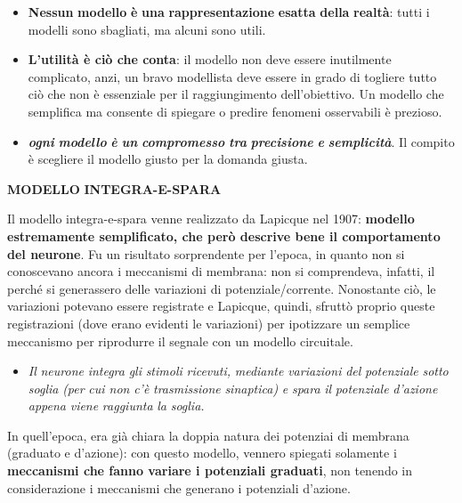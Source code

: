 \documentclass[12pt,a4paper]{book}
\begin{document}
\begin{itemize}
  \item \textbf{Nessun}\textbf{ }\textbf{modello}\textbf{ }\textbf{è}\textbf{ }\textbf{una}\textbf{ }\textbf{rappresentazione}\textbf{ }\textbf{esatta}\textbf{ }\textbf{della}\textbf{ }\textbf{realtà}: tutti i modelli sono sbagliati, ma alcuni sono utili.
  \item \textbf{L'utilità è ciò che conta}: il modello non deve essere inutilmente complicato, anzi, un bravo modellista deve essere in grado di togliere tutto ciò che non è essenziale per il raggiungimento dell'obiettivo. Un modello che sempliﬁca ma consente di spiegare o predire fenomeni osservabili è prezioso.
  \item \textbf{\textit{ogni}}\textbf{\textit{ }}\textbf{\textit{modello}}\textbf{\textit{ }}\textbf{\textit{è}}\textbf{\textit{ }}\textbf{\textit{un}}\textbf{\textit{ }}\textbf{\textit{compromesso}}\textbf{\textit{ }}\textbf{\textit{tra}}\textbf{\textit{ }}\textbf{\textit{precisione}}\textbf{\textit{ }}\textbf{\textit{e}}\textbf{\textit{ }}\textbf{\textit{semplicità}}. Il compito è scegliere il modello giusto per la domanda giusta.
\end{itemize}
\textbf{MODELLO}\textbf{  }\textbf{INTEGRA-E-}\textbf{SPARA}

Il modello integra-e-spara venne realizzato da Lapicque nel 1907: \textbf{modello estremamente sempliﬁcato, che però descrive bene il comportamento del neurone}. Fu un risultato sorprendente per l'epoca, in quanto non si conoscevano ancora i meccanismi di membrana: non si comprendeva, infatti, il perché si generassero delle variazioni di potenziale/corrente. Nonostante ciò, le variazioni potevano essere registrate e Lapicque, quindi, sfruttò proprio queste registrazioni (dove erano evidenti le variazioni) per ipotizzare un semplice meccanismo per riprodurre il segnale con un modello circuitale.

\begin{itemize}
  \item \textit{Il}\textit{ }\textit{neurone}\textit{ }\textit{integra}\textit{ }\textit{gli}\textit{ }\textit{stimoli}\textit{ }\textit{ricevuti,}\textit{ }\textit{mediante}\textit{ }\textit{variazioni}\textit{ }\textit{del}\textit{ }\textit{potenziale}\textit{ }\textit{sotto}\textit{ }\textit{soglia}\textit{ }\textit{(per}\textit{ }\textit{cui non}\textit{ }\textit{c'è}\textit{ }\textit{trasmissione}\textit{ }\textit{sinaptica)}\textit{ }\textit{e}\textit{ }\textit{spara}\textit{ }\textit{il}\textit{ }\textit{potenziale}\textit{ }\textit{d'azione}\textit{ }\textit{appena}\textit{ }\textit{viene}\textit{ }\textit{raggiunta}\textit{ }\textit{la}\textit{ }\textit{soglia.}
\end{itemize}
In quell'epoca, era già chiara la doppia natura dei potenziai di membrana (graduato e d'azione): con questo modello, vennero spiegati solamente i \textbf{meccanismi che fanno variare i potenziali graduati}, non tenendo in considerazione i meccanismi che generano i potenziali d'azione.
\end{document}
